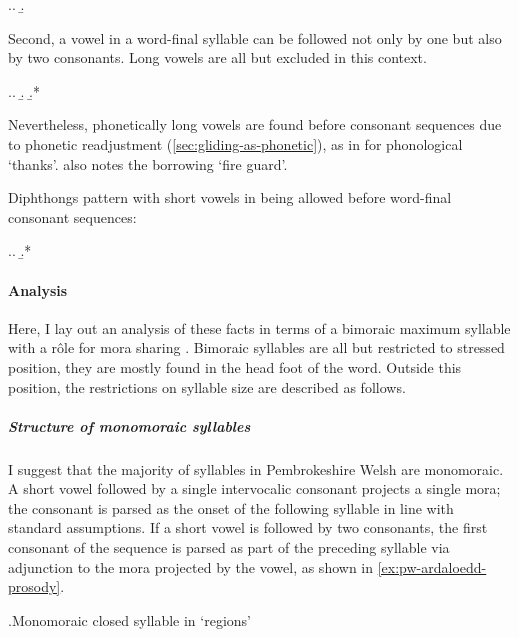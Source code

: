 \ex.\a.
\b.

Second, a vowel in a word\hyp final syllable can be followed not only by one but also by two consonants. Long vowels are all but excluded in this context.

\ex.\a.
\b.
\b.*\mbi{[ˈbaːlχ]}

Nevertheless, phonetically long vowels are found before consonant sequences due to phonetic readjustment (\cref{sec:gliding-as-phonetic}), as in  for phonological \ipa{[ˈdiːolχ]} `thanks'. \citet[\emph{s.~v.}]{thomas00:_welsh} also notes the borrowing \ipa{[ˈɡaːrd]} `fire guard'.

Diphthongs pattern with short vowels in being allowed before word\hyp final consonant sequences:

\ex.\a.
\b.*

\paragraph{Analysis}
\label{sec:analysis-11}

Here, I lay out an analysis of these facts in terms of a bimoraic maximum syllable with a rôle for mora sharing \citep[\cfm][]{broselow97:_syllab,moren06:_thai,munshi12:_weigh_srinag_koshur}. Bimoraic syllables are all but restricted to stressed position, \ie they are mostly found in the head foot of the word. Outside this position, the restrictions on syllable size are described as follows.

\subparagraph{Structure of monomoraic syllables}
\label{sec:struct-monom-syll}

I suggest that the majority of syllables in Pembrokeshire Welsh are monomoraic. A short vowel followed by a single intervocalic consonant projects a single mora; the consonant is parsed as the onset of the following syllable in line with standard assumptions. If a short vowel is followed by two consonants, the first consonant of the sequence is parsed as part of the preceding syllable via adjunction to the mora projected by the vowel, as shown in \ref{ex:pw-ardaloedd-prosody}.

\ex.\label{ex:pw-ardaloedd-prosody}Monomoraic closed syllable in \ipa{[arˈdaːloð]} `regions'\\


